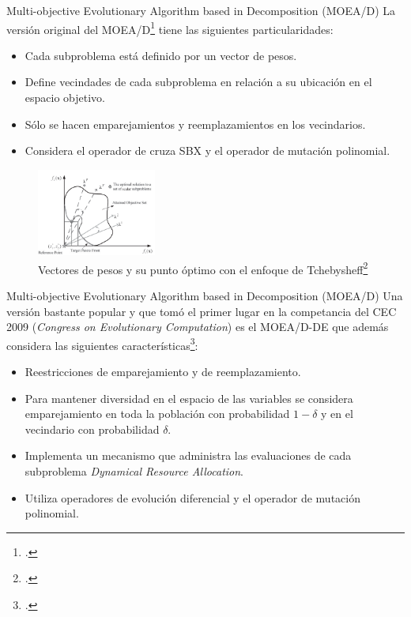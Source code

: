 \documentclass{beamer}
\begin{document}
\begin{frame}{Multi-objective Evolutionary Algorithm based in Decomposition (MOEA/D)}
\scriptsize
La versión original del MOEA/D\footcite{ishibuchi1998multi} tiene las siguientes particularidades:
\begin{itemize}
\scriptsize
    \item Cada subproblema está definido por un vector de pesos.
    \item Define vecindades de cada subproblema en relación a su ubicación en el espacio objetivo.
    \item Sólo se hacen emparejamientos y reemplazamientos en los vecindarios.
    \item Considera el operador de cruza SBX y el operador de mutación polinomial.
\end{itemize}
\begin{figure}[H]
\centering
\includegraphics[width=0.35\textwidth]{moead_diagrama.png}
\caption{\scriptsize Vectores de pesos y su punto óptimo con el enfoque de Tchebysheff\footcite{Joel:MOEAD_Adaptative}}
\end{figure}

\end{frame}

\begin{frame}{Multi-objective Evolutionary Algorithm based in Decomposition (MOEA/D)}
\scriptsize
Una versión bastante popular y que tomó el primer lugar en la competancia del CEC 2009 (\textit{Congress on Evolutionary Computation}) es el  MOEA/D-DE que además considera las siguientes características\footcite{li2009multiobjective}: 
\begin{itemize}
\scriptsize
    \item Reestricciones de emparejamiento y de reemplazamiento.
    \item Para mantener diversidad en el espacio de las variables se considera emparejamiento en toda la población con probabilidad $1 - \delta$ y en el vecindario con probabilidad $\delta$. 
    \item Implementa un mecanismo que administra las evaluaciones de cada subproblema \textit{Dynamical Resource Allocation}.
    \item Utiliza operadores de evolución diferencial y el operador de mutación polinomial.
\end{itemize}
\end{frame}
\end{document}
